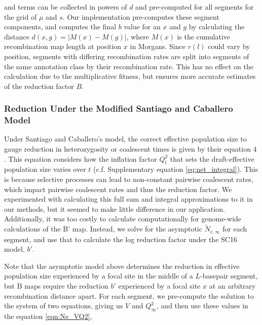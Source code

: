 \documentclass[11pt]{article}
\begin{document}
and terms can be collected in powers of $d$ and pre-computed for all segments
for the grid of $\mu$ and $s$. Our implementation pre-computes these segment
components, and computes the final $b$ value for an $x$ and $g$ by calculating
the distance $d(x,g) = |M(x) - M(g)|$, where $M(x)$ is the cumulative
recombination map length at position $x$ in Morgans. Since $r(l)$ could vary by
position, segments with differing recombination rates are split into segments
of the same annotation class by their recombination rate. This has no effect on
the calculation due to the multiplicative fitness, but ensures more accurate
estimates of the reduction factor $B$.


\subsubsection{Reduction Under the Modified Santiago and Caballero Model}
\label{supp:reduction-sc16}

Under Santiago and Caballero's model, the correct effective population size to
gauge reduction in heterozygosity or coalescent times is given by their
equation 4 \parencite{Santiago2016-mu}. This equation considers how the
inflation factor $Q_t^2$ that sets the draft-effective population size varies
over $t$ (c.f. Supplementary equation \ref{eq:net_integral}). This is because
selective processes can lead to non-constant pairwise coalescent rates, which
impact pairwise coalescent rates and thus the reduction factor. We experimented
with calculating this full sum and integral approximations to it in our
methods, but it seemed to make little difference in our application.
Additionally, it was too costly to calculate computationally for genome-wide
calculations of the B' map. Instead, we solve for the asymptotic
$\widetilde{N}_{e,\infty}$ for each segment, and use that to calculate the log
reduction factor under the SC16 model, $b'$.

Note that the asymptotic model above determines the reduction in effective
population size experienced by a focal site in the middle of a $L$-basepair
segment, but B maps require the reduction $b'$ experienced by a focal site $x$
at an arbitrary recombination distance apart. For each segment, we pre-compute
the solution to the system of two equations, giving us $V$ and $Q_\infty^2$,
and then use these values in the equation \eqref{eqn:Ne_VQ2},
\end{document}

